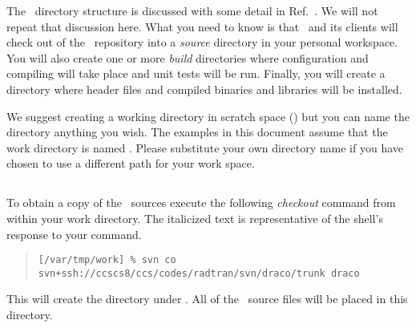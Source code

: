 The \draco\ directory structure is discussed with some detail in
Ref.~\cite{draco-build}.  We will not repeat that discussion here.
What you need to know is that \draco\ and its clients will check out
of the \svn\ repository into a \emph{source} directory in your
personal workspace.  You will also create one or more \emph{build}
directories where configuration and compiling will take place and unit
tests will be run.  Finally, you will create a directory where header
files and compiled binaries and libraries will be installed.

We suggest creating a working directory in scratch space () but you can name the directory anything you wish.
The examples in this document assume that the work directory is named
.  Please substitute your own directory name if
you have chosen to use a different path for your work space.

\subsection{\draco}

To obtain a copy of the \draco\ sources execute the following
\emph{checkout} command from within your work directory.  The
italicized text is representative of the shell's response to your
command.

\footnotesize
\begin{verse}
\texttt{[/var/tmp/work] \% svn co svn+ssh://ccscs8/ccs/codes/radtran/svn/draco/trunk draco} \\
\end{verse}
\normalsize

This will create the directory  under .  All
of the \draco\ source files will be placed in this directory.  

%

